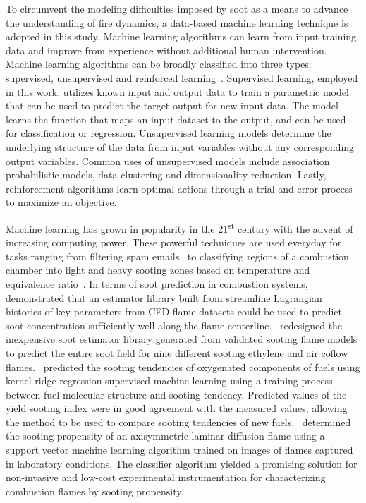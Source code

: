 \documentclass[12pt]{CHT-20}
\begin{document}
To circumvent the modeling difficulties imposed by soot as a means to advance the understanding of fire dynamics, a data-based machine learning technique is adopted in this study. Machine learning algorithms can learn from input training data and improve from experience without additional human intervention. Machine learning algorithms can be broadly classified into three types: supervised, unsupervised and reinforced learning~\citep[]{Vieira2019,Badillo2020}. Supervised learning, employed in this work, utilizes known input and output data to train a parametric model that can be used to predict the target output for new input data. The model learns the function that maps an input dataset to the output, and can be used for classification or regression. Unsupervised learning models determine the underlying structure of the data from input variables without any corresponding output variables. Common uses of unsupervised models include association probabilistic models, data clustering and dimensionality reduction. Lastly, reinforcement algorithms learn optimal actions through a trial and error process to maximize an objective. 

Machine learning has grown in popularity in the 21\textsuperscript{st} century with the advent of increasing computing power.
These powerful techniques are used everyday for tasks ranging from filtering spam emails~\citep[]{Sanghani2019} to classifying regions of a combustion chamber into light and heavy sooting zones based on temperature and equivalence ratio~\citep[]{Yu2019}.
In terms of soot prediction in combustion systems,~\citet{Alexander2018} demonstrated that an estimator library built from streamline Lagrangian histories of key parameters from CFD flame datasets could be used to predict soot concentration sufficiently well along the flame centerline.~\citet{Zimmer2019} redesigned the inexpensive soot estimator library generated from validated sooting flame models to predict the entire soot field for nine different sooting ethylene and air coflow flames.~\citet{Gao2019} predicted the sooting tendencies of oxygenated components of fuels using kernel ridge regression supervised machine learning using a training process between fuel molecular structure and sooting tendency. Predicted values of the yield sooting index were in good agreement with the measured values, allowing the method to be used to compare sooting tendencies of new fuels.~\citet{Rodriguez2019} determined the sooting propensity of an axisymmetric laminar diffusion flame using a support vector machine learning algorithm trained on images of flames captured in laboratory conditions. The classifier algorithm yielded a promising solution for non-invasive and low-cost experimental instrumentation for characterizing combustion flames by sooting propensity.
 
\end{document}
